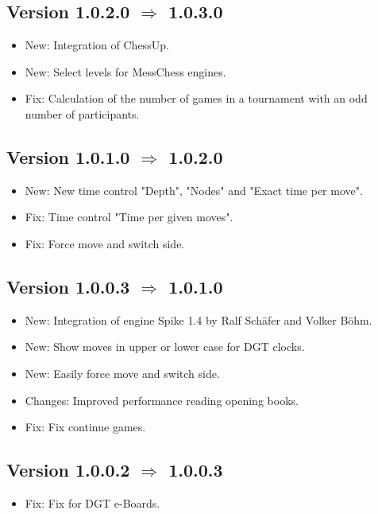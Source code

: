\documentclass[11pt,a4paper]{article}
\begin{document}
\subsection*{Version 1.0.2.0 $\Rightarrow$  1.0.3.0}
\begin{itemize}		
	\item {\color{blue}New}: Integration of ChessUp.
	\item {\color{blue}New}: Select levels for MessChess engines.
	\item {\color{red}Fix}: Calculation of the number of games in a tournament with an odd number of participants.
\end{itemize}


\subsection*{Version 1.0.1.0 $\Rightarrow$  1.0.2.0}
\begin{itemize}		
	\item {\color{blue}New}: New time control "Depth", "Nodes" and "Exact time per move".
	\item {\color{red}Fix}: Time control "Time per given moves".	
	\item {\color{red}Fix}: Force move and switch side.
\end{itemize}

\subsection*{Version 1.0.0.3 $\Rightarrow$  1.0.1.0}
\begin{itemize}		
	\item {\color{blue}New}: Integration of engine Spike 1.4 by Ralf Schäfer and Volker Böhm.
	\item {\color{blue}New}: Show moves in upper or lower case for DGT clocks.
	\item {\color{blue}New}: Easily force move and switch side.
	\item {\color{teal}Changes}: Improved performance reading opening books.
	\item {\color{red}Fix}: Fix continue games.	
\end{itemize}

\subsection*{Version 1.0.0.2 $\Rightarrow$  1.0.0.3}
\begin{itemize}		
	\item {\color{red}Fix}: Fix for DGT e-Boards.	
\end{itemize}
\end{document}
